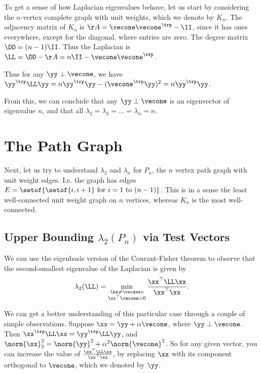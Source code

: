 To get a sense of how Laplacian eigenvalues behave, let us start by considering the $n$-vertex complete graph with unit weights,
which we denote by $K_n$.
The adjacency matrix of $K_n$ is $\AA = \vecone \vecone^\trp - \II$,
since it has ones everywhere, except for the diagonal, where entries
are zero.
The degree matrix $\DD = (n-1) \II$.
Thus the Laplacian is $\LL =  \DD - \AA = n\II - \vecone
\vecone^\trp$.

Thus for any $\yy \perp \vecone$, we have
$\yy^{\trp} \LL \yy = n \yy^{\trp} \yy - (\vecone^{\trp} \yy)^2 = n \yy^{\trp} \yy$.

From this, we can conclude that any $\yy \perp \vecone$ is an
eigenvector of eigenvalue $n$, and that all $\lambda_2 = \lambda_3 =
\ldots = \lambda_n = n$.

\section{The Path Graph}

Next, let us try to understand $\lambda_2$ and $\lambda_n$ for
$P_n$, the $n$ vertex path graph with unit weight edges.
I.e. the graph has edges $E = \setof{ \setof{i,i+1}  \text{ for } i = 1 \text{ to
  } (n-1) }$. This is in a sense the least well-connected unit weight graph on $n$
vertices, whereas $K_n$ is the most well-connected.

\subsection{Upper Bounding $\lambda_2(P_n)$ via Test Vectors} 

We can use the eigenbasis version of the Courant-Fisher theorem to observe
that the second-smallest eigenvalue of the Laplacian is given by
\begin{align}
  \label{eq:lambda2bymin}
\lambda_2(\LL) = \min_{ \substack{ \xx \neq \veczero \\ \xx^\top \vecone = 0} } \frac{ \xx^\top \LL \xx}{ \xx^\top \xx}.
\end{align}

We can get a better understanding of this particular case through a couple of simple
observations. Suppose $\xx = \yy + \alpha \vecone$, where $\yy \perp
\vecone$.
Then $\xx^{\trp} \LL \xx = \yy^{\trp} \LL \yy$, and $\norm{\xx}_2^2 =
\norm{\yy}^2 + \alpha^2 \norm{\vecone}^2$.
So for any given vector, you can increase the value of $\frac{
  \xx^\top \LL \xx}{ \xx^\top \xx}$, by replacing $\xx$ with
its component orthogonal to $\vecone$, which we denoted by $\yy$.

